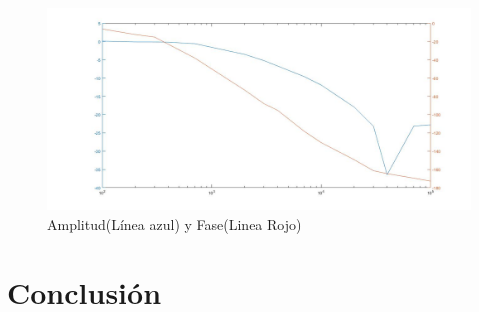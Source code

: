 \documentclass[10pt,a4paper]{article} %
\begin{document}
\begin{figure}[H]
	\begin{center}
		\includegraphics[scale=0.4]{bode4}
		\caption{Amplitud(Línea azul) y Fase(Linea Rojo)}
	\end{center}
\end{figure}


\section{Conclusión}
\end{document}
